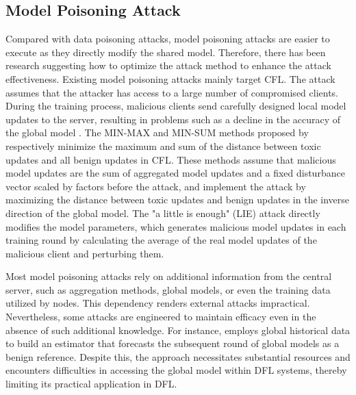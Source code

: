 \subsection{Model Poisoning Attack}
Compared with data poisoning attacks, model poisoning attacks are easier to execute as they directly modify the shared model. Therefore, there has been research suggesting how to optimize the attack method to enhance the attack effectiveness. Existing model poisoning attacks mainly target CFL. The attack assumes that the attacker has access to a large number of compromised clients. During the training process, malicious clients send carefully designed local model updates to the server, resulting in problems such as a decline in the accuracy of the global model \cite{cao2022mpaf}. The MIN-MAX and MIN-SUM methods proposed by \cite{shejwalkar2021manipulating} respectively minimize the maximum and sum of the distance between toxic updates and all benign updates in CFL. These methods assume that malicious model updates are the sum of aggregated model updates and a fixed disturbance vector scaled by factors before the attack, and implement the attack by maximizing the distance between toxic updates and benign updates in the inverse direction of the global model. 
The "a little is enough" (LIE) attack \cite{baruch2019little} directly modifies the model parameters, which generates malicious model updates in each training round by calculating the average of the real model updates of the malicious client and perturbing them. %

Most model poisoning attacks rely on additional information from the central server, such as aggregation methods, global models, or even the training data utilized by nodes. This dependency renders external attacks impractical. Nevertheless, some attacks are engineered to maintain efficacy even in the absence of such additional knowledge. For instance, \cite{zhang2023denial} employs global historical data to build an estimator that forecasts the subsequent round of global models as a benign reference. Despite this, the approach necessitates substantial resources and encounters difficulties in accessing the global model within DFL systems, thereby limiting its practical application in DFL.

